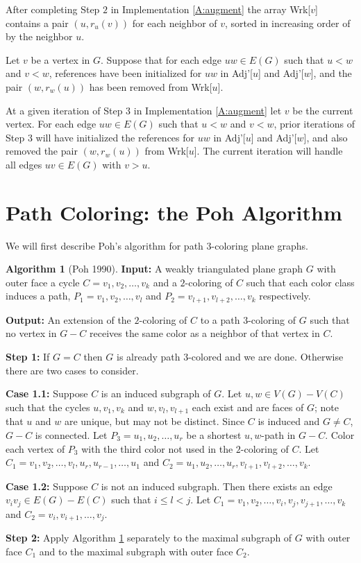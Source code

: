 \documentclass[12pt,letterpaper]{article}
\theoremstyle{plain}
\theoremstyle{definition}
\theoremstyle{break}
\newtheorem{algorithm}[lemma]{Algorithm}     %
\begin{document}
After completing Step $2$ in Implementation \ref{A:augment} the array Wrk[$v$] contains
a pair $(u,r_u(v))$ for each neighbor of $v$, sorted in increasing order of by
the neighbor $u$.

Let $v$ be a vertex in $G$. Suppose that for each edge $uw\in E(G)$ such that
$u<w$ and $v<w$, references have been initialized for $uw$ in Adj'[$u$] and
Adj'[$w$], and the pair $(w,r_w(u))$ has been removed from Wrk[$u$].

At a given iteration of Step $3$ in Implementation \ref{A:augment} let $v$ be the
current vertex. For each edge $uw\in E(G)$ such that
$u<w$ and $v<w$, prior iterations of Step 3 will have initialized the
references for $uw$ in Adj'[$u$] and Adj'[$w$], and also removed the pair
$(w,r_w(u))$ from Wrk[$u$]. The current iteration will handle all edges
$uv\in E(G)$ with $v>u$.

\section{Path Coloring: the Poh Algorithm}

We will first describe Poh's algorithm for path $3$-coloring plane graphs.

\begin{algorithm}[Poh 1990] \label{A:planar3}
\textbf{Input:} A weakly triangulated plane graph $G$ with outer face a
cycle $C=v_1,v_2,\ldots, v_k$ and a $2$-coloring of $C$ such
that each color class induces a path, $P_1=v_1,v_2,\ldots, v_l$ and
$P_2=v_{l+1},v_{l+2},\ldots, v_k$ respectively.

\noindent\textbf{Output:} An extension of the $2$-coloring of $C$ to a path
$3$-coloring of $G$ such that no vertex in $G-C$ receives the same color as a
neighbor of that vertex in $C$.

\noindent\textbf{Step 1:} If $G=C$ then $G$ is already path $3$-colored and we
are done. Otherwise there are two cases to consider.

\noindent\textbf{Case 1.1:} Suppose $C$ is an induced subgraph of $G$. Let
$u,w\in V(G)-V(C)$ such that the cycles $u,v_1,v_k$ and $w,v_l,v_{l+1}$ each
exist and are faces of $G$; note that
$u$ and $w$ are unique, but may not be distinct. Since $C$ is induced and
$G\ne C$, $G-C$ is connected.
Let $P_3=u_1,u_2,\ldots,u_r$ be a shortest $u,w$-path in $G-C$.
Color each vertex of $P_3$ with the third color not used in the $2$-coloring of
$C$. Let $C_1=v_1,v_2,\ldots,v_l,u_r,u_{r-1},\ldots,u_1$ and
$C_2=u_1,u_2,\ldots,u_r,v_{l+1},v_{l+2},\ldots,v_k$.

\noindent\textbf{Case 1.2:} Suppose $C$ is not an induced subgraph. Then there
exists an edge $v_iv_j\in E(G)-E(C)$ such that $i\le l < j$. Let
$C_1=v_1,v_2,\ldots,v_i,v_j,v_{j+1},\ldots,v_k$
and $C_2=v_i,v_{i+1},\ldots,v_j$.

\noindent\textbf{Step 2:} Apply Algorithm \ref{A:planar3} separately to the
maximal subgraph of $G$ with outer face $C_1$ and to the maximal subgraph with outer face
$C_2$.
\end{algorithm}
\end{document}
